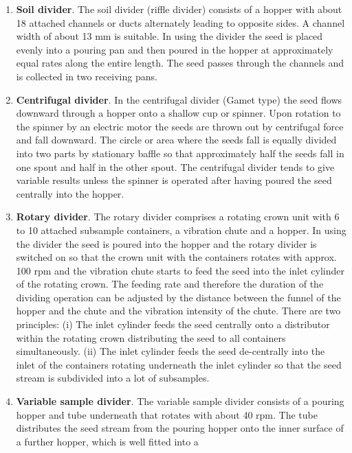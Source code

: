 \documentclass[]{book}
\begin{document}
\begin{enumerate}
\def\labelenumi{\alph{enumi}.}
\setcounter{enumi}{1}
\item
  \textbf{Soil divider}. The soil divider (riffle divider) consists of a
  hopper with about 18 attached channels or ducts alternately leading to
  opposite sides. A channel width of about 13 mm is suitable. In using
  the divider the seed is placed evenly into a pouring pan and then
  poured in the hopper at approximately equal rates along the entire
  length. The seed passes through the channels and is collected in two
  receiving pans.
\item
  \textbf{Centrifugal divider}. In the centrifugal divider (Gamet type)
  the seed flows downward through a hopper onto a shallow cup or
  spinner. Upon rotation to the spinner by an electric motor the seeds
  are thrown out by centrifugal force and fall downward. The circle or
  area where the seeds fall is equally divided into two parts by
  stationary baffle so that approximately half the seeds fall in one
  spout and half in the other spout. The centrifugal divider tends to
  give variable results unless the spinner is operated after having
  poured the seed centrally into the hopper.
\item
  \textbf{Rotary divider}. The rotary divider comprises a rotating crown
  unit with 6 to 10 attached subsample containers, a vibration chute and
  a hopper. In using the divider the seed is poured into the hopper and
  the rotary divider is switched on so that the crown unit with the
  containers rotates with approx. 100 rpm and the vibration chute starts
  to feed the seed into the inlet cylinder of the rotating crown. The
  feeding rate and therefore the duration of the dividing operation can
  be adjusted by the distance between the funnel of the hopper and the
  chute and the vibration intensity of the chute. There are two
  principles: (i) The inlet cylinder feeds the seed centrally onto a
  distributor within the rotating crown distributing the seed to all
  containers simultaneously. (ii) The inlet cylinder feeds the seed
  de-centrally into the inlet of the containers rotating underneath the
  inlet cylinder so that the seed stream is subdivided into a lot of
  subsamples.
\item
  \textbf{Variable sample divider}. The variable sample divider consists
  of a pouring hopper and tube underneath that rotates with about 40
  rpm. The tube distributes the seed stream from the pouring hopper onto
  the inner surface of a further hopper, which is well fitted into a

\end{enumerate}
\end{document}
